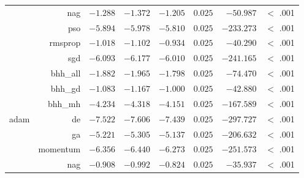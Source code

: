 \begin{table}[H]
{\begin{tabular}{lrrrrrrr}
			                     & nag                  & $-1.288$             & $-1.372$                                        & $-1.205$             & $0.025$              & $-50.987$            & $<$ .001    \\
			                     & pso                  & $-5.894$             & $-5.978$                                        & $-5.810$             & $0.025$              & $-233.273$           & $<$ .001    \\
			                     & rmsprop              & $-1.018$             & $-1.102$                                        & $-0.934$             & $0.025$              & $-40.290$            & $<$ .001    \\
			                     & sgd                  & $-6.093$             & $-6.177$                                        & $-6.010$             & $0.025$              & $-241.165$           & $<$ .001    \\
			                     & bhh\_all             & $-1.882$             & $-1.965$                                        & $-1.798$             & $0.025$              & $-74.470$            & $<$ .001    \\
			                     & bhh\_gd              & $-1.083$             & $-1.167$                                        & $-1.000$             & $0.025$              & $-42.880$            & $<$ .001    \\
			                     & bhh\_mh              & $-4.234$             & $-4.318$                                        & $-4.151$             & $0.025$              & $-167.589$           & $<$ .001    \\
			adam                 & de                   & $-7.522$             & $-7.606$                                        & $-7.439$             & $0.025$              & $-297.727$           & $<$ .001    \\
			$ $                  & ga                   & $-5.221$             & $-5.305$                                        & $-5.137$             & $0.025$              & $-206.632$           & $<$ .001    \\
			                     & momentum             & $-6.356$             & $-6.440$                                        & $-6.273$             & $0.025$              & $-251.573$           & $<$ .001    \\
			                     & nag                  & $-0.908$             & $-0.992$                                        & $-0.824$             & $0.025$              & $-35.937$            & $<$ .001    \\

\end{tabular}}
\end{table}
